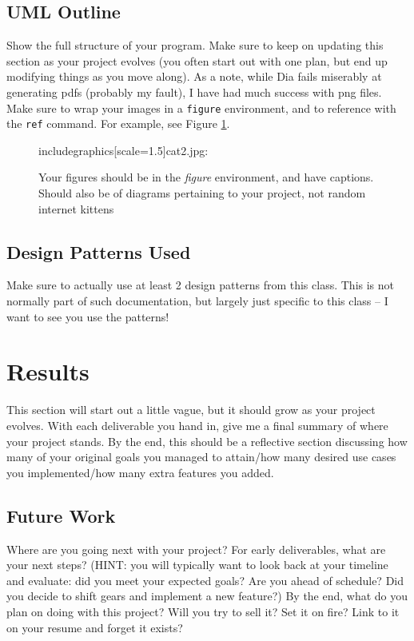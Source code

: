 \documentclass[10pt,conference,onecolumn,compsoc]{IEEEtran}
\begin{document}
\subsection{UML Outline}
Show the full structure of your program.  Make sure to keep on updating this section as your project evolves (you often start out with one plan, but end up modifying things as you move along).  As a note, while Dia fails miserably at generating pdfs (probably my fault), I have had much success with png files.  Make sure to wrap your images in a \texttt{figure} environment, and to reference with the \texttt{ref} command.  For example, see Figure \ref{cat2}.

\begin{figure}[ht!]
includegraphics[scale=1.5]{cat2.jpg}:
\caption{Your figures should be in the \emph{figure} environment, and have captions.  Should also be of diagrams pertaining to your project, not random internet kittens}
\label{cat2}
\end{figure}


\subsection{Design Patterns Used}
Make sure to actually use at least 2 design patterns from this class.  This is not normally part of such documentation, but largely just specific to this class -- I want to see you use the patterns!


\section{Results}
This section will start out a little vague, but it should grow as your project evolves.  With each deliverable you hand in, give me a final summary of where your project stands.  By the end, this should be a reflective section discussing how many of your original goals you managed to attain/how many desired use cases you implemented/how many extra features you added.

\subsection{Future Work}
Where are you going next with your project?
For early deliverables, what are your next steps?  (HINT: you will typically want to look back at your timeline and evaluate: did you meet your expected goals?  Are you ahead of schedule?  Did you decide to shift gears and implement a new feature?)
By the end, what do you plan on doing with this project?  Will you try to sell it?  Set it on fire?  Link to it on your resume and forget it exists?
\end{document}
